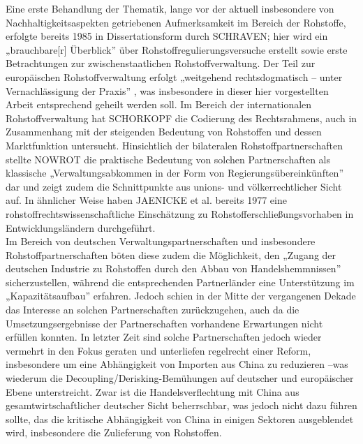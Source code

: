 \documentclass[12pt,a4paper,oneside]{book} %
\begin{document}
Eine erste Behandlung der Thematik, lange vor der aktuell insbesondere von Nachhaltigkeitsaspekten getriebenen Aufmerksamkeit im Bereich der Rohstoffe, erfolgte bereits 1985 in Dissertationsform durch SCHRAVEN;\autocite{schraven_internationale_1982} hier wird ein „brauchbare[r] Überblick” über Rohstoffregulierungsversuche erstellt sowie erste Betrachtungen zur zwischenstaatlichen Rohstoffverwaltung.\autocite{hanisch_besprechung_1984} Der Teil zur europäischen Rohstoffverwaltung erfolgt „weitgehend rechtsdogmatisch – unter Vernachlässigung der Praxis”\autocite{hanisch_besprechung_1984} , was insbesondere in dieser hier vorgestellten Arbeit entsprechend geheilt werden soll. Im Bereich der internationalen Rohstoffverwaltung hat SCHORKOPF die Codierung des Rechtsrahmens, auch in Zusammenhang mit der steigenden Bedeutung von Rohstoffen und dessen Marktfunktion untersucht.\autocite{schorkopf_internationale_2008} Hinsichtlich der bilateralen Rohstoffpartnerschaften stellte NOWROT die praktische Bedeutung von solchen Partnerschaften als klassische „Verwaltungsabkommen in der Form von Regierungsübereinkünften”\autocite{nowrot_bilaterale_2013} dar und zeigt zudem die Schnittpunkte aus unions- und völkerrechtlicher Sicht auf. In ähnlicher Weise haben JAENICKE et al. bereits 1977 eine rohstoffrechtswissenschaftliche Einschätzung zu Rohstofferschließungsvorhaben in Entwicklungsländern durchgeführt.\autocite{Rohstofferschließungsvorhaben in Entwicklungsländern}
\\
Im Bereich von deutschen Verwaltungspartnerschaften und insbesondere Rohstoffpartnerschaften böten diese zudem die Möglichkeit, den „Zugang der deutschen Industrie zu Rohstoffen durch den Abbau von Handelshemmnissen” sicherzustellen, während die entsprechenden Partnerländer eine Unterstützung im „Kapazitätsaufbau” erfahren.\autocite{ruttinger_deutschen_2016} Jedoch schien in der Mitte der vergangenen Dekade das Interesse an solchen Partnerschaften zurückzugehen, auch da die Umsetzungsergebnisse der Partnerschaften vorhandene Erwartungen nicht erfüllen konnten.\autocite{ruttinger_deutschen_2016} In letzter Zeit sind solche Partnerschaften jedoch wieder vermehrt in den Fokus geraten und unterliefen regelrecht einer \glqq Reform\grqq, insbesondere um eine Abhängigkeit von Importen aus China zu reduzieren\autocite{muller_reform_2023} --was wiederum die Decoupling/Derisking-Bemühungen auf deutscher und europäischer Ebene unterstreicht. Zwar ist die Handelsverflechtung mit China aus gesamtwirtschaftlicher deutscher Sicht beherrschbar, was jedoch nicht dazu führen sollte, das die kritische Abhängigkeit von China in einigen Sektoren ausgeblendet wird, insbesondere die Zulieferung von Rohstoffen.\autocite{Stursberg: Die Handelsbeziehungen mit China, EuzW 2025, 704} 
\end{document}
